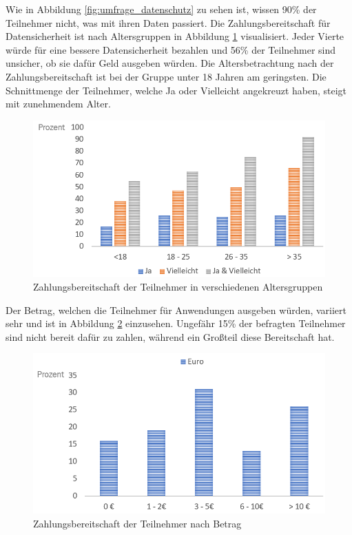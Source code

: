 \newpage

Wie in Abbildung \ref{fig:umfrage_datenschutz} zu sehen ist, wissen 90\% der Teilnehmer nicht, was mit ihren Daten passiert. Die Zahlungsbereitschaft für Datensicherheit ist nach Altersgruppen in Abbildung \ref{fig:umfrage_geld_gruppen} visualisiert. Jeder Vierte würde für eine bessere Datensicherheit bezahlen und 56\% der Teilnehmer sind unsicher, ob sie dafür Geld ausgeben würden. Die Altersbetrachtung nach der Zahlungsbereitschaft ist bei der Gruppe unter 18 Jahren am geringsten. Die Schnittmenge der Teilnehmer, welche \glqq Ja\grqq{} oder \glqq Vielleicht\grqq{} angekreuzt haben, steigt mit zunehmendem Alter.

\begin{figure}[!ht]
	\centering
	\includegraphics[width=0.9\linewidth]{Picture/umfrage_geld_gruppen}
	\caption[Zahlungsbereitschaft der Teilnehmer in verschiedenen Altersgruppen]{Zahlungsbereitschaft der Teilnehmer in verschiedenen Altersgruppen}
	\label{fig:umfrage_geld_gruppen}
\end{figure}

Der Betrag, welchen die Teilnehmer für Anwendungen ausgeben würden, variiert sehr und ist in Abbildung \ref{fig:umfrage_betrag} einzusehen. Ungefähr 15\% der befragten Teilnehmer sind nicht bereit dafür zu zahlen, während ein Großteil diese Bereitschaft hat.

\begin{figure}[!ht]
	\centering
	\includegraphics[width=0.9\linewidth]{Picture/umfrage_betrag}
	\caption[Zahlungsbereitschaft der Teilnehmer nach Betrag]{Zahlungsbereitschaft der Teilnehmer nach Betrag}
	\label{fig:umfrage_betrag}
\end{figure}

